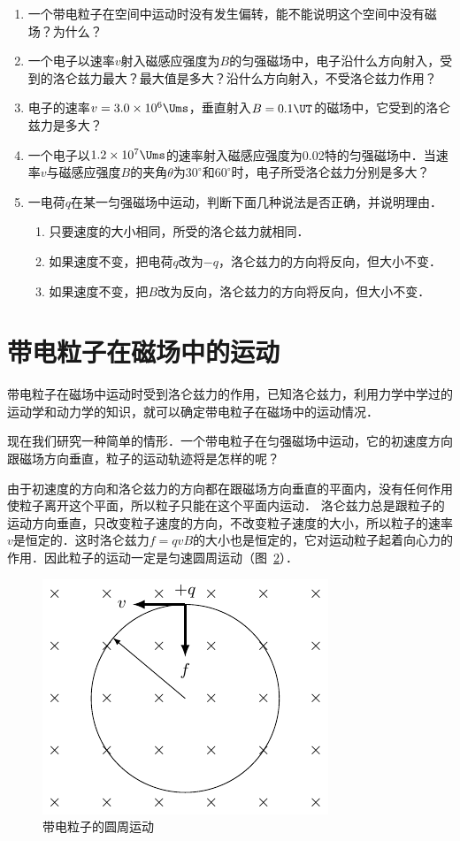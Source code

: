 \begin{enumerate}
\begin{figure}[htbp]
        \caption{}\label{fig_C_1-35}
    \end{figure}
    \item 一个带电粒子在空间中运动时没有发生偏转，能不能说明这个空间中没有磁场？为什么？
    \item 一个电子以速率$v$射入磁感应强度为$B$的匀强磁场中，电子沿什么方向射入，受到的洛仑兹力最大？最大值是多大？沿什么方向射入，不受洛仑兹力作用？
    \item 电子的速率$v=3.0\times10^6 \Ums$，垂直射入$B=0.1 \UT $的磁场中，它受到的洛仑兹力是多大？
    \item 一个电子以$1.2\times10^7\Ums$的速率射入磁感应强度为0.02特的匀强磁场中．当速率$v$与磁感应强度$B$的夹角$\theta$为$30^{\circ}$和$60^{\circ}$时，电子所受洛仑兹力分别是多大？
    \item 一电荷$q$在某一匀强磁场中运动，判断下面几种说法是否正确，并说明理由．
\begin{enumerate}
    \item 只要速度的大小相同，所受的洛仑兹力就相同．
    \item 如果速度不变，把电荷$q$改为$-q$，洛仑兹力的方向将反向，但大小不变．
    \item 如果速度不变，把$B$改为反向，洛仑兹力的方向将反向，但大小不变．
\end{enumerate}

\end{enumerate}


\section{带电粒子在磁场中的运动}
带电粒子在磁场中运动时受到洛仑兹力的作用，已知洛仑兹力，利用力学中学过的运动学和动力学的知识，就可以确定带电粒子在磁场中的运动情况．

现在我们研究一种简单的情形．一个带电粒子在匀强磁场中运动，它的初速度方向跟磁场方向垂直，粒子的运动轨迹将是怎样的呢？

由于初速度的方向和洛仑兹力的方向都在跟磁场方向垂直的平面内，没有任何作用使粒子离开这个平面，所以粒子只能在这个平面内运动．
洛仑兹力总是跟粒子的运动方向垂直，只改变粒子速度的方向，不改变粒子速度的大小，所以粒子的速率$v$是恒定的．这时洛仑兹力$f=qvB$的大小也是恒定的，它对运动粒子起着向心力的作用．因此粒子的运动一定是匀速圆周运动（图~\ref{fig_C_1-36}）．
\begin{figure}[htbp]
    \centering
    \includegraphics{fig/C/1-36.pdf}
    \caption{带电粒子的圆周运动}\label{fig_C_1-36}
\end{figure}

